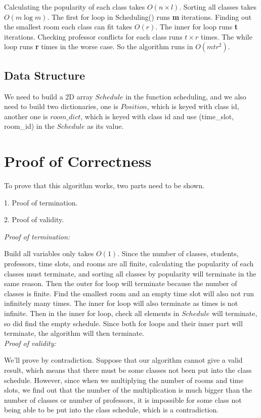 \documentclass[11pt, oneside]{article}   	%
\begin{document}
Calculating the popularity of each class takes $O(n \times l)$. Sorting all classes takes $O(m\log m)$. The first for loop in Scheduling() runs \textbf{m} iterations. Finding out the smallest room each class can fit takes $O(r)$. The inner for loop runs \textbf{t} iterations. Checking professor conflicts for each class runs $t \times r$ times. The while loop runs \textbf{r} times in the worse case. So the algorithm runs in $O(mtr^2)$.

\subsection{Data Structure}
We need to build a 2D array $Schedule$ in the function scheduling, and we also need to build two dictionaries, one is $Position$, which is keyed with class id, another one is $room\_dict$, which is keyed with class id and use (time\_slot, room\_id) in the $Schedule$ as its value. 


\section{Proof of Correctness}
To prove that this algorithm works, two parts need to be shown.

1. Proof of termination.

2. Proof of validity.

\textit{Proof of termination:}

Build all variables only takes $O(1)$. Since the number of classes, students, professors, time slots, and rooms are all finite, calculating the popularity of each classes must terminate, and sorting all classes by popularity will terminate in the same reason. Then the outer for loop will terminate because the number of classes is finite. Find the smallest room and an empty time slot will also not run infinitely many times. The inner for loop will also terminate as times is not infinite. Then in the inner for loop, check all elements in $Schedule$ will terminate, so did find the empty schedule. Since both for loops and their inner part will terminate, the algorithm will then terminate. \\

\textit{Proof of validity:}

We'll prove by contradiction. Suppose that our algorithm cannot give a valid result, which means that there must be some classes not been put into the class schedule. However, since when we multiplying the number of rooms and time slots, we find out that the number of the multiplication is much bigger than the number of classes or number of professors, it is impossible for some class not being able to be put into the class schedule, which is a contradiction.
\end{document}
